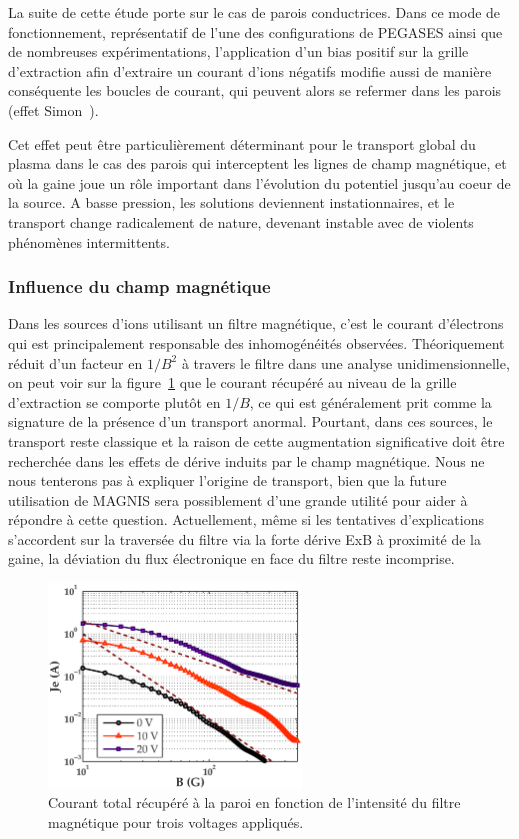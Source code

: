 \begin{refsection}
La suite de cette étude porte sur le cas de parois
conductrices. Dans ce mode de fonctionnement, représentatif de l'une des
configurations de PEGASES ainsi que de nombreuses expérimentations,
l'application d'un bias positif sur la grille d'extraction afin d'extraire un
courant d'ions négatifs modifie aussi de manière conséquente les boucles de
courant, qui peuvent alors se refermer dans les parois (effet
Simon~\parencite{Simon54}).

Cet effet peut être particulièrement déterminant pour le transport global du
plasma dans le cas des parois qui interceptent les lignes de champ magnétique,
et où la gaine joue un rôle important dans l'évolution du potentiel jusqu'au
coeur de la source. A basse pression, les solutions deviennent instationnaires, et le transport
change radicalement de nature, devenant instable avec de violents phénomènes
intermittents.
	
\subsubsection{Influence du champ magnétique}
Dans les sources d'ions utilisant un filtre magnétique, c'est le courant
d'électrons qui est principalement responsable des inhomogénéités observées.
Théoriquement réduit d'un facteur en $1/B^2$ à travers le filtre dans une
analyse unidimensionnelle, on peut voir sur la
figure~\ref{pegasesVarMagCourantParoi} que le courant récupéré au niveau de la
grille d'extraction se comporte plutôt en $1/B$, ce qui est
généralement prit comme la signature de la présence d'un transport anormal.
Pourtant, dans ces sources, le transport reste classique et la raison de cette
augmentation significative doit être recherchée dans les effets de dérive
induits par le champ magnétique. Nous ne nous tenterons pas à
expliquer l'origine de transport, bien que la future utilisation de MAGNIS sera
possiblement d'une grande utilité pour aider à répondre à cette question.
Actuellement, même si les tentatives d'explications s'accordent sur la
traversée du filtre via la forte dérive ExB à proximité de la gaine, la
déviation du flux électronique en face du filtre reste incomprise.

\begin{figure}[htbp]
	\centering
	\includegraphics[width=0.6\textwidth]{figures/4-pegasesVarMagCourantParoi.eps}
	{\caption{Courant total récupéré à la paroi en fonction de l'intensité du
	filtre magnétique pour trois voltages appliqués. }
	\label{pegasesVarMagCourantParoi}}
	\end{figure}


\end{refsection}
